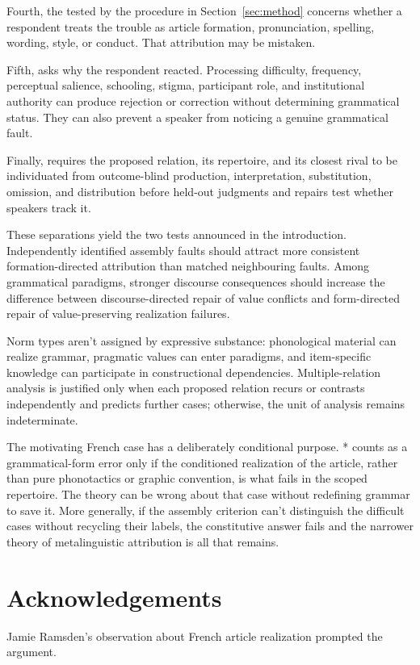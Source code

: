 \documentclass[12pt,letterpaper]{article}
\begin{document}
Fourth, the  tested by the procedure in
Section~\ref{sec:method} concerns whether a respondent treats the trouble
as article formation, pronunciation, spelling, wording, style, or conduct. That
attribution may be mistaken.

Fifth,  asks why the respondent reacted. Processing
difficulty, frequency, perceptual salience, schooling, stigma, participant role,
and institutional authority can produce rejection or correction without
determining grammatical status. They can also prevent a speaker from noticing a
genuine grammatical fault.

Finally,  requires the proposed relation, its
repertoire, and its closest rival to be individuated from outcome-blind production,
interpretation, substitution, omission, and distribution before held-out judgments
and repairs test whether speakers track it.

These separations yield the two tests announced in the introduction.
Independently identified assembly faults should attract more consistent
formation-directed attribution than matched neighbouring faults. Among
grammatical paradigms, stronger discourse consequences should increase the
difference between discourse-directed repair of value conflicts and form-directed
repair of value-preserving realization failures.

Norm types aren't assigned by expressive substance: phonological material can
realize grammar, pragmatic values can enter paradigms, and item-specific knowledge
can participate in constructional dependencies. Multiple-relation analysis is
justified only when each proposed relation recurs or contrasts independently and
predicts further cases; otherwise, the unit of analysis remains indeterminate.

The motivating French case has a deliberately conditional purpose. * counts as a grammatical-form error only if the conditioned realization of
the article, rather than pure phonotactics or graphic convention, is what fails in
the scoped repertoire. The theory can be wrong about that case without redefining
grammar to save it. More generally, if the assembly criterion can't distinguish the
difficult cases without recycling their labels, the constitutive answer
fails and the narrower theory of metalinguistic attribution is all that remains.

\ifdefined\anonymoussubmission\else
  \section*{Acknowledgements}

  Jamie Ramsden's observation about French article realization prompted the argument.
\fi

\clearpage
\printbibliography
\end{document}
